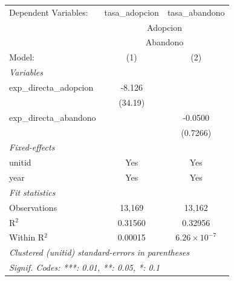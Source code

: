 
\begingroup
\centering
\begin{tabular}{lcc}
   \tabularnewline \midrule \midrule
   Dependent Variables:     & tasa\_adopcion  & tasa\_abandono\\   
    & \multicolumn{2}{c}{Adopcion} \\ 
    & \multicolumn{2}{c}{Abandono} \\ 
   Model:                   & (1)             & (2)\\  
   \midrule
   \emph{Variables}\\
   exp\_directa\_adopcion   & -8.126          &   \\   
                            & (34.19)         &   \\   
   exp\_directa\_abandono   &                 & -0.0500\\   
                            &                 & (0.7266)\\   
   \midrule
   \emph{Fixed-effects}\\
   unitid                   & Yes             & Yes\\  
   year                     & Yes             & Yes\\  
   \midrule
   \emph{Fit statistics}\\
   Observations             & 13,169          & 13,162\\  
   R$^2$                    & 0.31560         & 0.32956\\  
   Within R$^2$             & 0.00015         & $6.26\times 10^{-7}$\\   
   \midrule \midrule
   \multicolumn{3}{l}{\emph{Clustered (unitid) standard-errors in parentheses}}\\
   \multicolumn{3}{l}{\emph{Signif. Codes: ***: 0.01, **: 0.05, *: 0.1}}\\
\end{tabular}
\par\endgroup


